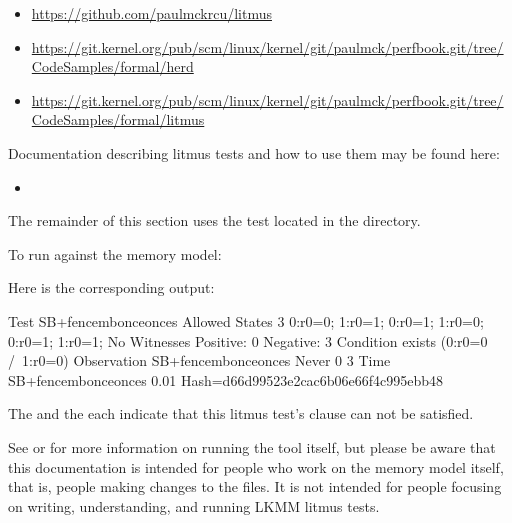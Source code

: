 \begin{itemize}
  \item \url{https://github.com/paulmckrcu/litmus}
  \item \url{https://git.kernel.org/pub/scm/linux/kernel/git/paulmck/perfbook.git/tree/CodeSamples/formal/herd}
  \item \url{https://git.kernel.org/pub/scm/linux/kernel/git/paulmck/perfbook.git/tree/CodeSamples/formal/litmus}
\end{itemize}

Documentation describing litmus tests and how to use them may be found
here:

\begin{itemize}
  \item \hyperref[sec:docs:Linux-kernel memory model litmus tests]{
    }
\end{itemize}

The remainder of this section uses the 
test located in the  directory.

To run  against the memory model:


Here is the corresponding output:

\begin{VerbatimU}
  Test SB+fencembonceonces Allowed
  States 3
  0:r0=0; 1:r0=1;
  0:r0=1; 1:r0=0;
  0:r0=1; 1:r0=1;
  No
  Witnesses
  Positive: 0 Negative: 3
  Condition exists (0:r0=0 /\ 1:r0=0)
  Observation SB+fencembonceonces Never 0 3
  Time SB+fencembonceonces 0.01
  Hash=d66d99523e2cac6b06e66f4c995ebb48
\end{VerbatimU}

The  and the  each indicate that
this litmus test's  clause can not be satisfied.

See  or  for more information on
running the tool itself, but please be aware that this documentation is
intended for people who work on the memory model itself, that is, people
making changes to the  files.
It is not intended for people focusing on writing, understanding, and
running LKMM litmus tests.

